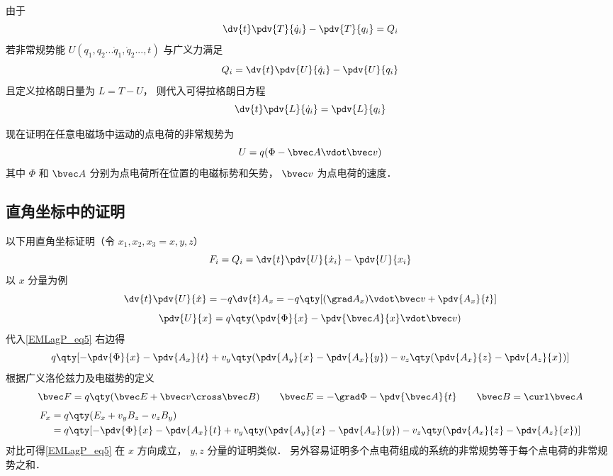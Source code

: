 
由于
\begin{equation}
\dv{t}\pdv{T}{\dot q_i} - \pdv{T}{q_i} = Q_i
\end{equation}
若非常规势能  $U(q_1, q_2...\dot q_1, \dot q_2..., t)$ 与广义力满足
\begin{equation}\label{EMLagP_eq2}
Q_i = \dv{t} \pdv{U}{\dot q_i} - \pdv{U}{q_i}
\end{equation}
且定义拉格朗日量为 $L = T - U$， 则代入可得拉格朗日方程
\begin{equation}
\dv{t} \pdv{L}{\dot q_i} = \pdv{L}{q_i}
\end{equation}

现在证明在任意电磁场中运动的点电荷的非常规势为
\begin{equation}\label{EMLagP_eq4}
U = q(\Phi  - \bvec A \vdot \bvec v)
\end{equation}
其中 $\Phi$ 和 $\bvec A$ 分别为点电荷所在位置的电磁标势和矢势， $\bvec v$ 为点电荷的速度．

\subsection{直角坐标中的证明}
以下用直角坐标证明（令 $x_1, x_2, x_3 = x,y,z$）
\begin{equation}\label{EMLagP_eq5}
F_i = Q_i =  \dv{t} \pdv{U}{\dot x_i} - \pdv{U}{x_i}
\end{equation}
以 $x$ 分量为例
\begin{equation}
\dv{t} \pdv{U}{\dot x} =  - q\dv{t} A_x =  - q\qty[ (\grad A_x) \vdot \bvec v + \pdv{A_x}{t} ]
\end{equation}
\begin{equation}
\pdv{U}{x} = q\qty( \pdv{\Phi}{x} - \pdv{\bvec A}{x} \vdot \bvec v )
\end{equation}
代入\autoref{EMLagP_eq5} 右边得
\begin{equation}
q\qty[ -\pdv{\Phi}{x} - \pdv{A_x}{t} + v_y \qty( \pdv{A_y}{x} - \pdv{A_x}{y} ) - v_z \qty( \pdv{A_x}{z} - \pdv{A_z}{x}) ]
\end{equation} 
根据广义洛伦兹力及电磁势的定义
\begin{equation}
\bvec F = q\qty(\bvec E + \bvec v \cross \bvec B)
\qquad
\bvec E =  - \grad \Phi  - \pdv{\bvec A}{t}
\qquad
\bvec B = \curl \bvec A
\end{equation}
\begin{equation}\begin{aligned}
F_x &= q \qty(E_x + v_y B_z - v_z B_y) \\
&= q\qty[ - \pdv{\Phi}{x} - \pdv{A_x}{t} + v_y \qty(\pdv{A_y}{x} - \pdv{A_x}{y}) - v_z \qty( \pdv{A_x}{z} - \pdv{A_z}{x}) ]
\end{aligned}\end{equation}
对比可得\autoref{EMLagP_eq5} 在 $x$ 方向成立， $y,z$ 分量的证明类似． 另外容易证明多个点电荷组成的系统的非常规势等于每个点电荷的非常规势之和．

